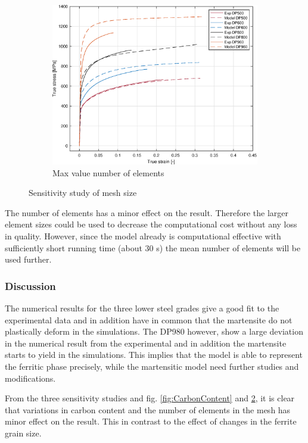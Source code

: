 \documentclass{article}
\begin{document}
\begin{figure}[h!]
          \hfill
     \begin{subfigure}[b]{0.3\textwidth}
         \centering
         \includegraphics[width=\textwidth]{MeshMax.eps}
         \caption{Max value number of elements}
         \label{fig:MeshMax}
     \end{subfigure}
     \caption{Sensitivity study of mesh size}
     \label{fig:Mesh}
\end{figure}

The number of elements has a minor effect on the result. Therefore the larger element sizes could be used to decrease the computational cost without any loss in quality. However, since the model already is computational effective with sufficiently short running time (about 30 s) the mean number of elements will be used further. 

\subsubsection{Discussion}
The numerical results for the three lower steel grades give a good fit to the experimental data and in addition have in common that the martensite do not plastically deform in the simulations. The DP980 however, show a large deviation in the numerical result from the experimental and in addition the martensite starts to yield in the simulations. This implies that the model is able to represent the ferritic phase precisely, while the martensitic model need further studies and modifications. 

From the three sensitivity studies and fig. \ref{fig:CarbonContent} and \ref{fig:Mesh}, it is clear that variations in carbon content and the number of elements in the mesh has minor effect on the result. This in contrast to the effect of changes in the ferrite grain size. 
\end{document}
